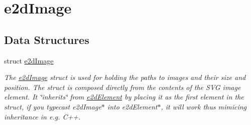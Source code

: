 \hypertarget{group__e2dImage}{\section{e2d\-Image}
\label{group__e2dImage}
}
\subsection*{Data Structures}
\begin{DoxyCompactItemize}
\item 
struct \hyperlink{structe2dImage}{e2d\-Image}
\begin{DoxyCompactList}\small\item\em The \hyperlink{structe2dImage}{e2d\-Image} struct is used for holding the paths to images and their size and position. The struct is composed directly from the contents of the S\-V\-G image element. It \char`\"{}inherits\char`\"{} from \hyperlink{structe2dElement}{e2d\-Element} by placing it as the first element in the struct, if you typecast e2d\-Image$\ast$ into e2d\-Element$\ast$, it will work thus mimicing inheritance in e.\-g. C++. \end{DoxyCompactList}\end{DoxyCompactItemize}
